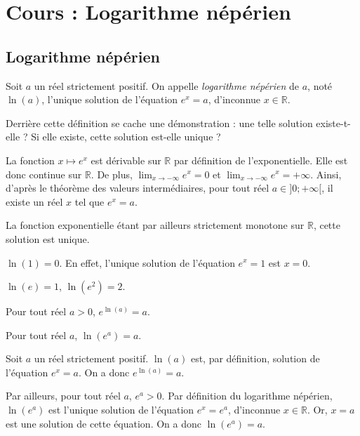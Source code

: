 \documentclass[11pt,fleqn, openany]{book} %
\begin{document}


\chapter{Cours : Logarithme népérien}

\section{Logarithme népérien}

\begin{definition} Soit $a$ un réel strictement positif. On appelle \textit{logarithme népérien} de $a$, noté $\ln (a)$, l'unique solution de l'équation $e^x =a$, d'inconnue $x \in \mathbb{R}$.\end{definition}

\begin{demonstration}Derrière cette définition se cache une démonstration : une telle solution existe-t-elle ? Si elle existe, cette solution est-elle unique ?

La fonction $x\mapsto e^x$ est dérivable sur $\mathbb{R}$ par définition de l'exponentielle. Elle est donc continue sur $\mathbb{R}$. De plus, $\displaystyle \lim _{x \to -\infty} e^x = 0$ et $\displaystyle \lim _{x \to -\infty} e^x = +\infty$. Ainsi, d'après le théorème des valeurs intermédiaires, pour tout réel $a \in ]0;+\infty[$, il existe un réel $x$ tel que $e^x = a$.

La fonction exponentielle étant par ailleurs strictement monotone sur $\mathbb{R}$, cette solution est unique.\end{demonstration}

\begin{example}$\ln (1)=0$. En effet, l'unique solution de l'équation $e^x=1$ est $x=0$.\end{example}

\begin{example} $\ln(e)=1$, $\ln(e^2)=2$.\end{example}

\begin{proposition}Pour tout réel $a>0$, $e^{\ln (a)} = a$.

Pour tout réel $a$, $\ln(e^a)=a$.

\end{proposition}

\begin{demonstration}Soit $a$ un réel strictement positif. $\ln(a)$ est, par définition, solution de l'équation $e^x=a$. On a donc $e^{\ln(a)}=a$.

Par ailleurs, pour tout réel $a$, $e^a>0$. Par définition du logarithme népérien, $\ln(e^a)$ est l'unique solution de l'équation $e^x=e^a$, d'inconnue $x\in \mathbb{R}$. Or, $x=a$ est une solution de cette équation. On a donc $\ln (e^a)=a$.
\end{demonstration}
\end{document}
